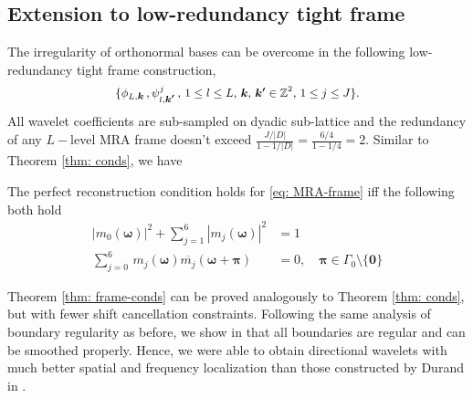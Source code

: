 \subsection{Extension to low-redundancy tight frame}\label{sec: frame}
The irregularity of orthonormal bases can be overcome in the following low-redundancy tight frame construction,
 \begin{align}\label{eq: MRA-frame}
 \{\phi_{L,\boldsymbol{k}}\,,\psi^j_{l,\boldsymbol{k'}}\,, \, {\small 1\leq l \leq L,\, \boldsymbol{k},\,\boldsymbol{k'}\in \mathbb{Z}^2,\,1\leq j \leq J\}}.
\end{align}  
All wavelet coefficients are sub-sampled on dyadic sub-lattice and the redundancy of any $L-$level MRA frame doesn't exceed $\frac{J/|D|}{1-1/|D|} = \frac{6/4}{1-1/4} = 2$.
Similar to Theorem \ref{thm: conds}, we have
\begin{thm}\label{thm: frame-conds}
The perfect reconstruction condition holds for \eqref{eq: MRA-frame} iff the following both hold
\begin{align}
\textstyle |m_0(\boldsymbol{\omega})|^2 + \sum_{j = 1}^6|m_j(\boldsymbol{\omega})|^2 &= 1 \\
\textstyle\sum_{j = 0}^6\,m_j(\boldsymbol{\omega})\overline{m_j}(\boldsymbol{\omega} + \boldsymbol{\pi}) &= 0,\quad  \boldsymbol{\pi}\in \Gamma_0\setminus\{\boldsymbol{0}\} \label{eq: reduced-shift-cancel}
\end{align}
\end{thm}
Theorem \ref{thm: frame-conds} can be proved analogously to Theorem \ref{thm: conds}, 
but with fewer shift cancellation constraints. Following the same analysis of boundary regularity as before, we show in \cite{yin2014orthshear} that all boundaries are regular and can be smoothed properly. Hence, we were able to obtain directional wavelets with much better spatial and frequency localization than those constructed by Durand in \cite{durand2007}. 
